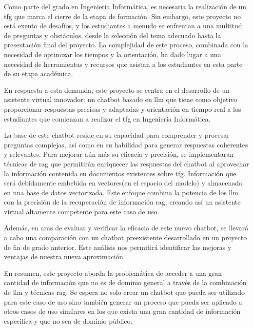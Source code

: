 
Como parte del grado en Ingeniería Informática, es necesaria la realización de un \acrfull{tfg} que marca el cierre de la etapa de formación. Sin embargo, este proyecto no está exento de desafíos, y los estudiantes a menudo se enfrentan a una multitud de preguntas y obstáculos, desde la selección del tema adecuado hasta la presentación final del proyecto\cite{lopez2010final}. La complejidad de este proceso, combinada con la necesidad de optimizar los tiempos y la orientación, ha dado lugar a una necesidad de herramientas y recursos que asistan a los estudiantes en esta parte de su etapa académica\cite{lopez2009proceso}.

En respuesta a esta demanda, este proyecto se centra en el desarrollo de un asistente virtual innovador: un chatbot basado en \acrfull{llm} que tiene como objetivo proporcionar respuestas precisas y adaptadas y orientación en tiempo real a los estudiantes que comienzan a realizar el \acrshort{tfg} en Ingeniería Informática\cite{Lewis2020}.

La base de este chatbot reside en su capacidad para comprender y procesar preguntas complejas, así como en su habilidad para generar respuestas coherentes y relevantes. Para mejorar aún más su eficacia y precisión, se implementaran técnicas de \acrfull{rag} que permitirán enriquecer las respuestas del chatbot al aprovechar la información contenida en documentos existentes sobre \acrshort{tfg}. Información que será debidamente embebida en vectores(en el espacio del modelo) y almacenada en una base de datos vectorizada. Este enfoque combina la potencia de los \acrshort{llm} con la precisión de la recuperación de información \acrshort{rag}, creando así un asistente virtual altamente competente para este caso de uso.

Además, en aras de evaluar y verificar la eficacia de este nuevo chatbot, se llevará a cabo una comparación con un chatbot preexistente desarrollado en un proyecto de fin de grado anterior. Este análisis nos permitirá identificar las mejoras y ventajas de nuestra nueva aproximación.

En resumen, este proyecto aborda la problemática de acceder a una gran cantidad de información que no es de dominio general a través de la combinación de \acrshort{llm} y técnicas \acrshort{rag}. Se espera no solo crear un chatbot que pueda ser utilizado para este caso de uso sino también generar un proceso que pueda ser aplicado a otros casos de uso similares en los que exista una gran cantidad de información especifica y que no sea de dominio público. 




